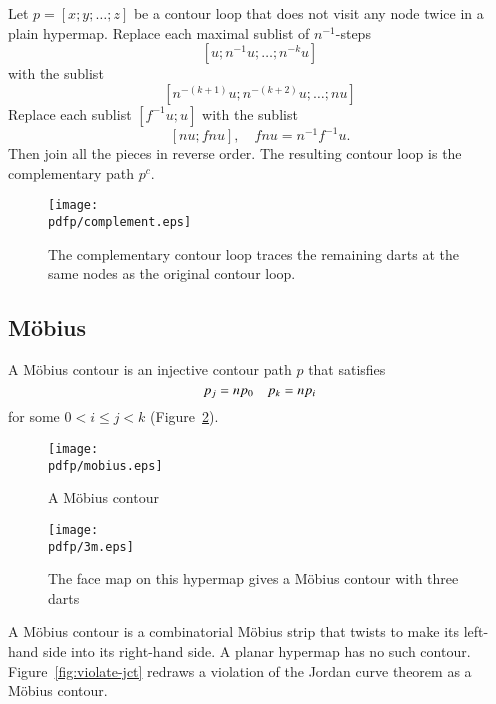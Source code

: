 \begin{definition} 
Let $p=[x;y;\ldots;z]$ be a contour loop that does not visit any node twice in a plain hypermap.   Replace each maximal sublist of $n^{-1}$-steps
$$
[u;n^{-1} u; \ldots; n^{-k} u]
$$
with the sublist
$$
[n^{-(k+1)} u;n^{-(k+2)} u;\ldots; n u]
$$
Replace each sublist $[f^{-1} u;u]$ with the sublist
$$
[n u; f n u],\quad f n u = n^{-1} f^{-1} u.
$$
Then join all the pieces in reverse order. The resulting contour loop is the complementary path $p^c$.
\end{definition}

\begin{figure}[htb]
  \centering
  \texttt{[image: \\pdfp/complement.eps]}
  \caption{The complementary contour loop traces the remaining darts
   at the same nodes as the original contour loop. }
  \label{fig:contour-comp}
\end{figure}

\subsection{M\"obius}

\begin{definition} A M\"obius contour is an
injective contour path $p$ that satisfies
    \begin{equation}
    \tlabel{eqn:mobius}
    p_j = n p_0\quad p_k = n p_i
    \end{equation}
for some $0 < i\le j< k$ (Figure~\ref{fig:mobius}).
\end{definition}

\begin{figure}[htb]
  \centering
  \texttt{[image: \\pdfp/mobius.eps]}
  \caption{A M\"obius contour}
  \label{fig:mobius}
\end{figure}

\begin{figure}[htb]
  \centering
  \texttt{[image: \\pdfp/3m.eps]}
  \caption{The face map on this hypermap gives a M\"obius contour with three darts}
  \label{fig:3m}
\end{figure}

\begin{remark} A M\"obius contour is a 
combinatorial M\"obius strip that
twists to make 
its left-hand side into
its right-hand side.  A planar hypermap has no such contour.  
Figure~\ref{fig:violate-jct}
redraws a violation of the Jordan curve theorem
as a M\"obius contour.   
\end{remark}

